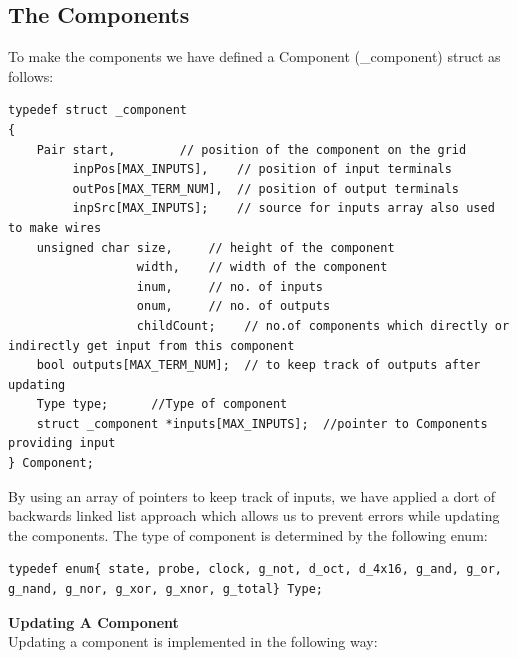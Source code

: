 \documentclass[report]{subfiles}
\begin{document}
\subsection{The Components}
To make the components we have defined a Component (\_component) struct as follows:
\begin{lstlisting}
typedef struct _component
{
    Pair start,         // position of the component on the grid
         inpPos[MAX_INPUTS],    // position of input terminals
         outPos[MAX_TERM_NUM],  // position of output terminals
         inpSrc[MAX_INPUTS];    // source for inputs array also used to make wires
    unsigned char size,     // height of the component
                  width,    // width of the component
                  inum,     // no. of inputs
                  onum,     // no. of outputs
                  childCount;    // no.of components which directly or indirectly get input from this component
    bool outputs[MAX_TERM_NUM];  // to keep track of outputs after updating
    Type type;      //Type of component
    struct _component *inputs[MAX_INPUTS];  //pointer to Components providing input
} Component;
\end{lstlisting}
By using an array of pointers to keep track of inputs,  we have applied a dort of backwards linked list approach which allows us to prevent errors while updating the components. The type of component is determined by the following enum:
\begin{lstlisting}
typedef enum{ state, probe, clock, g_not, d_oct, d_4x16, g_and, g_or, g_nand, g_nor, g_xor, g_xnor, g_total} Type;
\end{lstlisting}
\textbf{Updating A Component}\\
Updating a component is implemented in the following way: 
\end{document}
